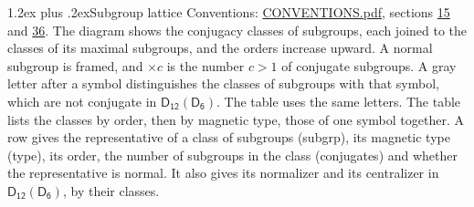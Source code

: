 \documentclass[10pt,a4paper]{article}
\makeatletter
\renewcommand\section{\@startsection{section}{1}{\z@}{-3ex plus -1ex minus -.2ex}%
  {1.2ex plus .2ex}{\normalfont\large\sffamily\bfseries\color{parttitle}}}
\numberwithin{equation}{section}
\newcommand{\grp}[1]{\mathsf{#1}}
\makeatother
\begin{document}
\section{Subgroup lattice}\label{s:subgroups}
Conventions: \href{../../CONVENTIONS.pdf}{CONVENTIONS.pdf}, sections \href{../../../rotation/CONVENTIONS.pdf\#conv.15}{15} and \href{../../CONVENTIONS.pdf\#conv.36}{36}.
The diagram shows the conjugacy classes of subgroups, each joined to the classes of its maximal subgroups, and the orders increase upward. \label{n:index.conjugates.c}\label{n:mark.conjugates}A normal subgroup is framed, and ${\times}c$ is the number $c > 1$ of conjugate subgroups. \label{n:mark.letter}A gray letter after a symbol distinguishes the classes of subgroups with that symbol, which are not conjugate in $\grp{D_{12}}(\grp{D_{6}})$. The table uses the same letters. The table lists the classes by order, then by magnetic type, those of one symbol together. \label{n:head.subgroup}\label{n:head.magnetic.type}\label{n:head.order}\label{n:head.conjugates}\label{n:head.normal}A row gives the representative of a class of subgroups (subgrp), its magnetic type (type), its order, the number of subgroups in the class (conjugates) and whether the representative is normal. \label{n:head.normalizer}\label{n:head.centralizer}It also gives its normalizer and its centralizer in $\grp{D_{12}}(\grp{D_{6}})$, by their classes. 
\end{document}
